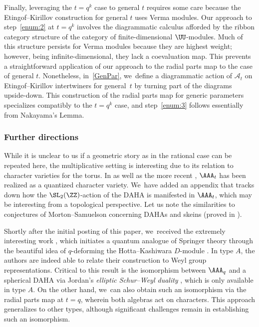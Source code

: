 Finally, leveraging the $t=q^k$ case to general $t$ requires some care because the Etingof--Kirillov construction for general $t$ uses Verma modules.
Our approach to step~\eqref{enum:2} at $t=q^k$ involves the diagrammatic calculus afforded by the ribbon category structure of the category of finite-dimensional $\UU$-modules.
Much of this structure persists for Verma modules because they are highest weight; however, being infinite-dimensional, they lack a coevaluation map.
This prevents a straightforward application of our approach to the radial parts map to the case of general $t$.
Nonetheless, in~\ref{GenPar}, we~define a diagrammatic action of $\mathcal{A}_t$ on Etingof--Kirillov intertwiners for general~$t$ by turning part of the diagrams upside-down.
This construction of the radial parts map for generic parameters specializes compatibly to the $t=q^k$ case, and step~\eqref{enum:3} follows essentially from Nakayama's Lemma.

\subsubsection*{Further directions}
While it is unclear to us if a geometric story as in the rational case can be repeated here, the multiplicative setting is interesting due to its relation to character varieties for the torus.
In \cite{AlekScho} as well as the more recent \cite{BBJ1,BBJ2}, $\AAA_t$ has been realized as a quantized character variety. We~have added an appendix that tracks down how the $\SL_2(\ZZ)$-action of the DAHA is manifested in $\AAA_t$, which may be interesting from a topological perspective.
Let us note the similarities to conjectures of Morton--Samuelson \cite{MortSamDAHA} concerning DAHAs and skeins (proved in \cite{BCMN}).

Shortly after the initial posting of this paper, we~received the extremely interesting work \cite{GJV}, which initiates a quantum analogue of Springer theory through the beautiful idea of $q$-deforming the Hotta--Kashiwara $D$-module \cite{HottKash}.
In type $A$, the authors are indeed able to relate their construction to Weyl group representations.
Critical to this result is the isomorphism between $\AAA_q$ and a spherical DAHA via Jordan's \textit{elliptic Schur--Weyl duality} \cite{JordanEll,JorVaz}, which is only available in type $A$.
On the other hand, we~can also obtain such an isomorphism via the radial parts map at $t=q$, wherein both algebras act on characters.
This approach generalizes to other types, although significant challenges remain in establishing such an isomorphism.

